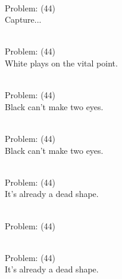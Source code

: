 \documentclass[11pt]{article}
\begin{document}
\begin{minipage}[t]{0.5\textwidth}
  {\centering
  
\\
Problem: (44)\\
Capture...\\
  }
\end{minipage}
\begin{minipage}[t]{0.5\textwidth}
  {\centering
  
\\
Problem: (44)\\
White plays on the vital point.\\
  }
\end{minipage}
\begin{minipage}[t]{0.5\textwidth}
  {\centering
  
\\
Problem: (44)\\
Black can't make two eyes.\\
  }
\end{minipage}
\begin{minipage}[t]{0.5\textwidth}
  {\centering
  
\\
Problem: (44)\\
Black can't make two eyes.\\
  }
\end{minipage}
\begin{minipage}[t]{0.5\textwidth}
  {\centering
  
\\
Problem: (44)\\
It's already a dead shape.\\
  }
\end{minipage}
\begin{minipage}[t]{0.5\textwidth}
  {\centering
  
\\
Problem: (44)\\
  }
\end{minipage}
\begin{minipage}[t]{0.5\textwidth}
  {\centering
  
\\
Problem: (44)\\
It's already a dead shape.\\
  }
\end{minipage}
\end{document}
